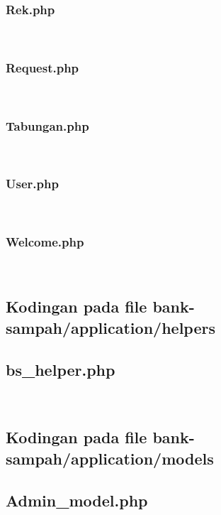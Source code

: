 \subsubsection{Rek.php}
\hfill\\

\subsubsection{Request.php}		
\hfill\\

\subsubsection{Tabungan.php}
\hfill\\

\subsubsection{User.php}
\hfill\\

\subsubsection{Welcome.php}
\hfill\\


\subsection{Kodingan pada file bank-sampah/application/helpers}
\subsection{bs\_helper.php}
\hfill\\


\subsection{Kodingan pada file bank-sampah/application/models}
\subsection{Admin\_model.php}
\hfill\\

